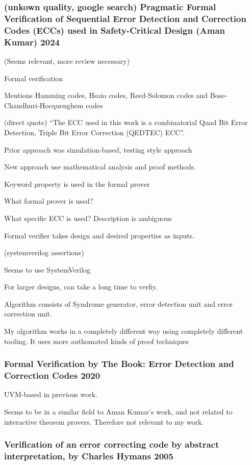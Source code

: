\documentclass{article}
\begin{document}
\subsubsection{(unkown quality, google search) Pragmatic Formal Verification of Sequential Error
Detection and Correction Codes (ECCs) used in
Safety-Critical Design (Aman Kumar) 2024}

(Seems relevant, more review necessary)

Formal verification

Mentions Hamming codes, Hsaio codes, Reed-Solomon codes and Bose-Chandhuri-Hocquenghem codes

(direct quote) ``The ECC used in this work is a combinatorial Quad Bit Error Detection, Triple Bit Error Correction (QEDTEC) ECC''.

Prior approach was simulation-based, testing style approach

New approach use mathematical analysis and proof methods.

Keyword property is used in the formal prover

What formal prover is used?

What specific ECC is used? Description is ambiguous

Formal verifier takes design and desired properties as inputs.

(systemverilog assertions)

Seems to use SystemVerilog

For larger designs, can take a long time to verfiy.

Algorithm consists of Syndrome generator, error detection unit and error correction unit.

My algorithm works in a completely different way using completely different tooling. It uses more authomated kinds of proof techniques

\subsubsection{Formal Verification by The Book: Error Detection and Correction Codes 2020}

UVM-based in previous work.

Seems to be in a similar field to Aman Kumar's work, and not related to interactive theorem provers. Therefore not relevant to my work.

\subsubsection{Verification of an error correcting code by abstract interpretation, by Charles Hymans 2005}
\end{document}
